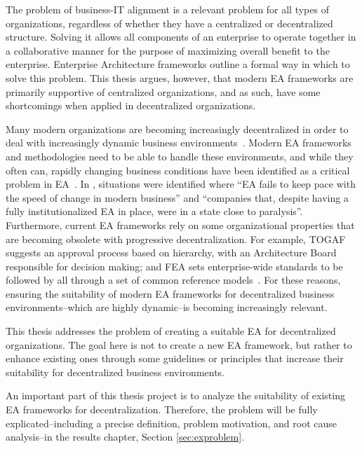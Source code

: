 The problem of business-IT alignment is a relevant problem for all types of organizations, regardless of whether they have a centralized or decentralized structure. Solving it allows all components of an enterprise to operate together in a collaborative manner for the purpose of maximizing overall benefit to the enterprise. Enterprise Architecture frameworks outline a formal way in which to solve this problem. This thesis argues, however, that modern EA frameworks are primarily supportive of centralized organizations, and as such, have some shortcomings when applied in decentralized organizations. 

Many modern organizations are becoming increasingly decentralized in order to deal with increasingly dynamic business environments~\cite{fulk1995}. Modern EA frameworks and methodologies need to be able to handle these environments, and while they often can, rapidly changing business conditions have been identified as a critical problem in EA~\cite{kaisler2005ea,lucke2010critical}. In \cite[Ch. 1]{Bente2012}, situations were identified where ``EA fails to keep pace with the speed of change in modern business'' and ``companies that, despite having a fully institutionalized EA in place, were in a state close to paralysis''. Furthermore, current EA frameworks rely on some organizational properties that are becoming obsolete with progressive decentralization. For example, TOGAF~\cite[Ch. 47]{togaf9.1} suggests an approval process based on hierarchy, with an Architecture Board responsible for decision making; and FEA sets enterprise-wide standards to be followed by all through a set of common reference models~\cite{sessions2007}. For these reasons, ensuring the suitability of modern EA frameworks for  decentralized business environments--which are highly dynamic--is becoming increasingly relevant. 

This thesis addresses the problem of creating a suitable EA for decentralized organizations. The goal here is not to create a new EA framework, but rather to enhance existing ones through some guidelines or principles that increase their suitability for decentralized business environments.

An important part of this thesis project is to analyze the suitability of existing EA frameworks for decentralization. Therefore, the problem will be fully explicated--including a precise definition, problem motivation, and root cause analysis--in the results chapter, Section \ref{sec:exproblem}.

